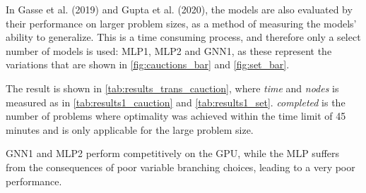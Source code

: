 In Gasse et al. (2019) \cite{gasse2019exact} and Gupta et al. (2020), the models are also evaluated by their performance on larger problem sizes, as a method of measuring the models' ability to generalize.
This is a time consuming process, and therefore only a select number of models is used: MLP1, MLP2 and GNN1, as these represent the variations that are shown in \cref{fig:cauctions_bar} and \cref{fig:set_bar}.

The result is shown in \cref{tab:results_trans_cauction}, where \textit{time} and \textit{nodes} is measured as in \cref{tab:results1_cauction} and \cref{tab:results1_set}.
\textit{completed} is the number of problems where optimality was achieved within the time limit of 45 minutes and is only applicable for the large problem size. 

GNN1 and MLP2 perform competitively on the \gls{GPU}, while the \gls{MLP} suffers from the consequences of poor variable branching choices, leading to a very poor performance. 


